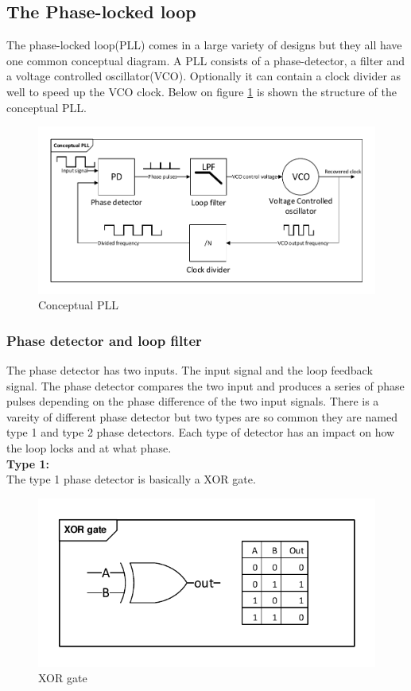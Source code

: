 \subsection{The Phase-locked loop}
The phase-locked loop(PLL) comes in a large variety of designs but they all have one common conceptual diagram. A PLL consists of a phase-detector, a filter and a voltage controlled oscillator(VCO). Optionally it can contain a clock divider as well to speed up the VCO clock. Below on figure \ref{fig:conceptualpll} is shown the structure of the conceptual PLL.

\begin{figure}[H]
	\centering
	\includegraphics[width=.9\textwidth]{billeder/10technologystudies/conceptualpll}
	\caption{Conceptual PLL}
	\label{fig:conceptualpll}
\end{figure}

\subsubsection{Phase detector and loop filter}
The phase detector has two inputs. The input signal and the loop feedback signal. The phase detector compares the two input and produces a series of phase pulses depending on the phase difference of the two input signals. There is a vareity of different phase detector but two types are so common they are named type 1 and type 2 phase detectors. Each type of detector has an impact on how the loop locks and at what phase.
\\ \textbf{Type 1:}\\
The type 1 phase detector is basically a XOR gate. 

\begin{figure}[H]
	\centering
	\includegraphics[width=.6\textwidth]{billeder/10technologystudies/XORgate}
	\caption{XOR gate}
	\label{fig:XOR}
\end{figure}

